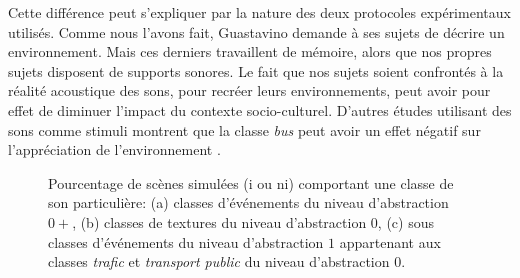 Cette différence peut s'expliquer par la nature des deux protocoles expérimentaux utilisés. Comme nous l'avons fait, Guastavino demande à ses sujets de décrire un environnement. Mais ces derniers travaillent de mémoire, alors que nos propres sujets disposent de supports sonores. Le fait que nos sujets soient confrontés à la réalité acoustique des sons, pour recréer leurs environnements, peut avoir pour effet de diminuer l'impact du contexte socio-culturel. D'autres études utilisant des sons comme stimuli montrent que la classe \emph{bus} peut avoir un effet négatif sur l'appréciation de l'environnement \citep{lavandier2006contribution}.

\begin{figure}[t]
        \myfloatalign
         \par
       \caption[Pourcentage de scènes simulées comportant une classe de son particulière.]{Pourcentage de scènes simulées (i ou ni) comportant une classe de son particulière: (a) classes d'événements du niveau d'abstraction $0+$, (b) classes de textures du niveau d'abstraction $0$, (c) sous classes d'événements du niveau d'abstraction $1$ appartenant aux classes \emph{trafic} et \emph{transport public} du niveau d'abstraction $0$.}\label{fig:soundsource}
\end{figure}

